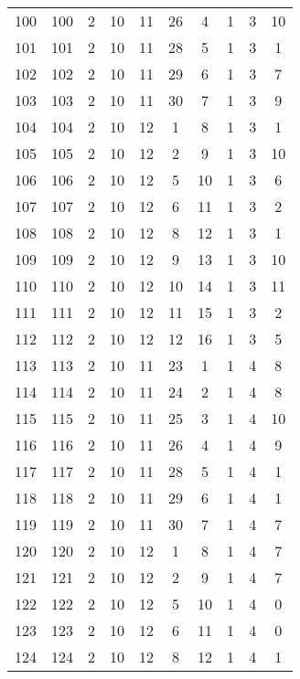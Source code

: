 \begin{longtable}{cccccccccc}
  100 & 100 &   2 &  10 &  11 &  26 &   4 &   1 &   3 &  10 \\ 
  101 & 101 &   2 &  10 &  11 &  28 &   5 &   1 &   3 &   1 \\ 
  102 & 102 &   2 &  10 &  11 &  29 &   6 &   1 &   3 &   7 \\ 
  103 & 103 &   2 &  10 &  11 &  30 &   7 &   1 &   3 &   9 \\ 
  104 & 104 &   2 &  10 &  12 &   1 &   8 &   1 &   3 &   1 \\ 
  105 & 105 &   2 &  10 &  12 &   2 &   9 &   1 &   3 &  10 \\ 
  106 & 106 &   2 &  10 &  12 &   5 &  10 &   1 &   3 &   6 \\ 
  107 & 107 &   2 &  10 &  12 &   6 &  11 &   1 &   3 &   2 \\ 
  108 & 108 &   2 &  10 &  12 &   8 &  12 &   1 &   3 &   1 \\ 
  109 & 109 &   2 &  10 &  12 &   9 &  13 &   1 &   3 &  10 \\ 
  110 & 110 &   2 &  10 &  12 &  10 &  14 &   1 &   3 &  11 \\ 
  111 & 111 &   2 &  10 &  12 &  11 &  15 &   1 &   3 &   2 \\ 
  112 & 112 &   2 &  10 &  12 &  12 &  16 &   1 &   3 &   5 \\ 
  113 & 113 &   2 &  10 &  11 &  23 &   1 &   1 &   4 &   8 \\ 
  114 & 114 &   2 &  10 &  11 &  24 &   2 &   1 &   4 &   8 \\ 
  115 & 115 &   2 &  10 &  11 &  25 &   3 &   1 &   4 &  10 \\ 
  116 & 116 &   2 &  10 &  11 &  26 &   4 &   1 &   4 &   9 \\ 
  117 & 117 &   2 &  10 &  11 &  28 &   5 &   1 &   4 &   1 \\ 
  118 & 118 &   2 &  10 &  11 &  29 &   6 &   1 &   4 &   1 \\ 
  119 & 119 &   2 &  10 &  11 &  30 &   7 &   1 &   4 &   7 \\ 
  120 & 120 &   2 &  10 &  12 &   1 &   8 &   1 &   4 &   7 \\ 
  121 & 121 &   2 &  10 &  12 &   2 &   9 &   1 &   4 &   7 \\ 
  122 & 122 &   2 &  10 &  12 &   5 &  10 &   1 &   4 &   0 \\ 
  123 & 123 &   2 &  10 &  12 &   6 &  11 &   1 &   4 &   0 \\ 
  124 & 124 &   2 &  10 &  12 &   8 &  12 &   1 &   4 &   1 \\ 

\end{longtable}
